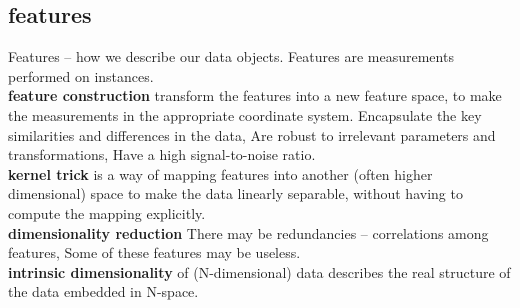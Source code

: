 \documentclass[cheatsheet.tex]{subfiles}
\begin{document}
\subsection{features}
Features -- how we describe our data objects. Features are measurements performed on instances.  
\\
\textbf{feature construction} transform the features into a new feature space, to make the
measurements in the appropriate coordinate system. Encapsulate the key similarities and differences in the data, Are robust to irrelevant parameters and transformations, Have a high signal-to-noise ratio. 
\\
\textbf{kernel trick} is a way of mapping features into another (often higher dimensional) space to make
the data linearly separable, without having to compute the mapping explicitly.
\\
\textbf{dimensionality reduction} There may be redundancies -- correlations among features, Some of these features may be useless. 
\\
\textbf{intrinsic dimensionality} of (N-dimensional) data describes the real structure of the data embedded in N-space. 
\end{document}
